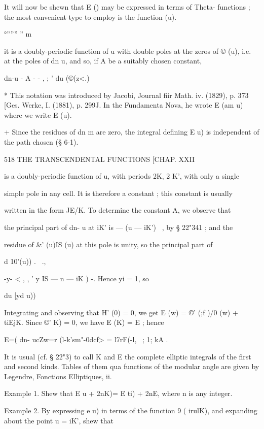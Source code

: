 It will now be shewn that E () may be expressed in terms of Theta-
functions ; the most convenient type to employ is the function (u).



 °'''''' '' m %



it is a doubly-periodic function of u with double poles at the zeros
of © (u), i.e. at the poles of dn u, and so, if A be a suitably chosen
constant,

dn-u - A - - , ; ' du (©(z<.)

* This notation was introduced by Jacobi, Journal fiir Math. iv.
(1829), p. 373 [Ges. Werke, I. (1881), p. 299J. In the Fundamenta
Nova, he wrote E (am u) where we write E (u).

+ Since the residues of dn m are zero, the integral defining E u) is
independent of the path chosen (§ 6-1).



518 THE TRANSCENDENTAL FUNCTIONS [CHAP. XXII

is a doubly-periodic function of u, with periods 2K, 2 K', with only a
single

simple pole in any cell. It is therefore a constant ; this constant is
usually

written in the form JE/K. To determine the constant A, we observe that

the principal part of dn- u at iK' is — (u — iK')~ , by § 22"341 ; and
the

residue of \&' (u)IS (u) at this pole is unity, so the principal part
of

d 10'(u)) . \ .,

-y- < , , ' y IS — n — iK ) -. Hence yi = 1, so

du [yd u))

Integrating and observing that H' (0) = 0, we get E (w) = ©' (;f )/0
(w) + tiEjK. Since ©' K) = 0, we have E (K) = E ; hence

E=( dn- ucZw=r (l-k'sm"-0dcf> = l7rF(-l, ~; 1; kA .

It is usual (cf. § 22"3) to call K and E the complete elliptic
integrals of the first and second kinds. Tables of them qua functions
of the modular angle are given by Legendre, Fonctions Elliptiques, ii.

Example 1. Shew that E u + 2nK)= E ti) + 2nE, where n is any integer.

Example 2. By expressing e u) in terms of the function 9 ( irulK), and
expanding about the point u = iK', shew that

